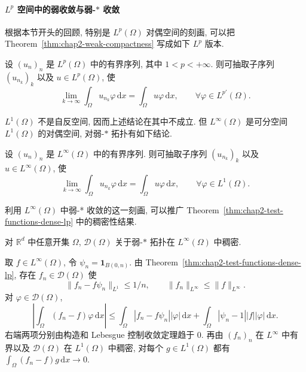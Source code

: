 \paragraph{$L^p$ 空间中的弱收敛与弱-$*$ 收敛}
\label{subsec:chap2-lebesgue-weak-convergences}

根据本节开头的回顾, 特别是 $L^p(\Omega)$ 对偶空间的刻画, 可以把 Theorem~\ref{thm:chap2-weak-compactness} 写成如下 $L^p$ 版本.

\begin{Proposition}
\label{prop:chap2-bounded-lp-weak-subsequence}
设 $(u_n)_n$ 是 $L^p(\Omega)$ 中的有界序列, 其中 $1<p<+\infty$. 则可抽取子序列 $(u_{n_k})_k$ 以及 $u\in L^p(\Omega)$, 使
\[
 \lim_{k\to\infty}\int_\Omega u_{n_k}\varphi\,\mathrm{d}x
 =\int_\Omega u\varphi\,\mathrm{d}x,
 \qquad\forall\varphi\in L^{p'}(\Omega).
\]
\end{Proposition}

$L^1(\Omega)$ 不是自反空间, 因而上述结论在其中不成立. 但 $L^\infty(\Omega)$ 是可分空间 $L^1(\Omega)$ 的对偶空间, 对弱-$*$ 拓扑有如下结论.

\begin{Proposition}
\label{prop:chap2-bounded-linfty-weak-star-subsequence}
设 $(u_n)_n$ 是 $L^\infty(\Omega)$ 中的有界序列. 则可抽取子序列 $(u_{n_k})_k$ 以及 $u\in L^\infty(\Omega)$, 使
\[
 \lim_{k\to\infty}\int_\Omega u_{n_k}\varphi\,\mathrm{d}x
 =\int_\Omega u\varphi\,\mathrm{d}x,
 \qquad\forall\varphi\in L^1(\Omega).
\]
\end{Proposition}

利用 $L^\infty(\Omega)$ 中弱-* 收敛的这一刻画, 可以推广 Theorem~\ref{thm:chap2-test-functions-dense-lp} 中的稠密性结果.

\begin{Theorem}
\label{thm:chap2-test-functions-weak-star-dense-linfty}
对 $\mathbb{R}^d$ 中任意开集 $\Omega$, $\mathcal{D}(\Omega)$ 关于弱-$*$ 拓扑在 $L^\infty(\Omega)$ 中稠密.
\end{Theorem}

\begin{Proof}
取 $f\in L^\infty(\Omega)$, 令 $\psi_n=\mathbf{1}_{B(0,n)}$. 由 Theorem~\ref{thm:chap2-test-functions-dense-lp}, 存在 $f_n\in\mathcal{D}(\Omega)$ 使
\[
 \|f_n-f\psi_n\|_{L^1}\leq1/n,
 \qquad\|f_n\|_{L^\infty}\leq\|f\|_{L^\infty}.
\]
对 $\varphi\in\mathcal{D}(\Omega)$,
\[
 \left|\int_\Omega(f_n-f)\varphi\,\mathrm{d}x\right|
 \leq\int_\Omega|f_n-f\psi_n||\varphi|\,\mathrm{d}x
 +\int_\Omega|\psi_n-1||f||\varphi|\,\mathrm{d}x.
\]
右端两项分别由构造和 Lebesgue 控制收敛定理趋于 $0$. 再由 $(f_n)_n$ 在 $L^\infty$ 中有界以及 $\mathcal{D}(\Omega)$ 在 $L^1(\Omega)$ 中稠密, 对每个 $g\in L^1(\Omega)$ 都有 $\int_\Omega(f_n-f)g\,\mathrm{d}x\to0$.
\end{Proof}

